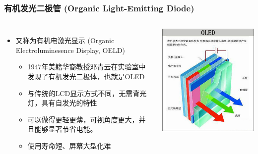 \documentclass{beamer}
\newcommand{\fullPageImage}[2]{
	{
		\usebackgroundtemplate{\texttt{[image: \#1]}}
		\frame[plain]{#2}
	}
}
\begin{document}
\fullPageImage{images/whiteLED.jpg}{\transwipe}
\fullPageImage{images/led_diode.jpg}{\transwipe}
\fullPageImage{images/LED2.jpg}{\transwipe}
\fullPageImage{images/led-matrix.jpg}{\transwipe}

\begin{frame}
	\frametitle{有机发光二极管 (Organic Light-Emitting Diode)}
	\begin{columns}
	\begin{itemize}
		\item 又称为有机电激光显示 (Organic Electroluminesence Display, OELD)
		\begin{itemize}
			\item 1947年美籍华裔教授邓青云在实验室中发现了有机发光二极体，也就是OLED
		    \item 与传统的LCD显示方式不同，无需背光灯，具有自发光的特性
		    \item 可以做得更轻更薄，可视角度更大，并且能够显著节省电能。
		    \item 使用寿命短、屏幕大型化难
		\end{itemize}
	\end{itemize}
	\includegraphics[width=.9\textwidth, height=.3\textheight]{images/oled-principle.jpg}\\ %

\end{columns}
\end{frame}
\end{document}

